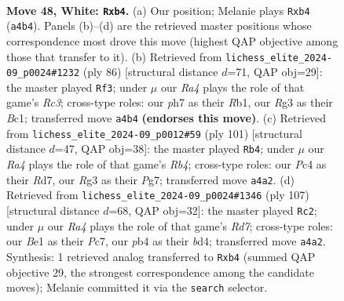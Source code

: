 \documentclass[11pt]{article}
\begin{document}
\clearpage

\begin{figure}[p]\centering
\begin{subfigure}{0.46\textwidth}\centering
\resizebox{\linewidth}{!}{%
\newchessgame
\chessboard[
  setfen={1r1r1b2/7p/p2pn1k1/P3p1Pp/RpP1P3/1P3PR1/2K3B1/4B3 w - - 10 48},
  showmover=false,
  pgfstyle=straightmove, color=movearrow, markmove={a4-b4}
]}
\caption{}
\end{subfigure}\hfill
\begin{subfigure}{0.46\textwidth}\centering
\resizebox{\linewidth}{!}{%
\newchessgame
\chessboard[
  setfen={rn4k1/4b1p1/r3p2p/1b1pP2P/1PpP2P1/P1R5/6K1/1RBB2N1 w - - 1 44},
  showmover=false,
  pgfstyle=straightmove, color=movearrow, markmove={c3-f3}
]}
\caption{}
\end{subfigure}
\\[4pt]
\begin{subfigure}{0.46\textwidth}\centering
\resizebox{\linewidth}{!}{%
\newchessgame
\chessboard[
  setfen={8/3r2pk/1bp2p2/pr2pPp1/4P1K1/1PRP3P/2R1N1P1/8 b - - 7 51},
  showmover=false,
  pgfstyle=straightmove, color=movearrow, markmove={b5-b4}
]}
\caption{}
\end{subfigure}\hfill
\begin{subfigure}{0.46\textwidth}\centering
\resizebox{\linewidth}{!}{%
\newchessgame
\chessboard[
  setfen={2k5/2p2p2/2pr2p1/p5Pp/P2BPK1P/1bP2P2/3r4/R6R b - - 58 54},
  showmover=false,
  pgfstyle=straightmove, color=movearrow, markmove={d2-c2}
]}
\caption{}
\end{subfigure}
\caption{\textbf{Move 48, White: \texttt{Rxb4}.} (a) Our position; Melanie plays \texttt{Rxb4} (\texttt{a4b4}). Panels (b)--(d) are the retrieved master positions whose correspondence most drove this move (highest QAP objective among those that transfer to it). (b) Retrieved from \texttt{lichess\_elite\_2024-09\_p0024\#1232} (ply 86) [structural distance $d$=71, QAP obj=29]: the master played \texttt{Rf3}; under $\mu$ our \emph{Ra4} plays the role of that game's \emph{Rc3}; cross-type roles: our \emph{p}h7 as their \emph{R}b1, our \emph{R}g3 as their \emph{B}c1; transferred move \texttt{a4b4} \textbf{(endorses this move)}. (c) Retrieved from \texttt{lichess\_elite\_2024-09\_p0012\#59} (ply 101) [structural distance $d$=47, QAP obj=38]: the master played \texttt{Rb4}; under $\mu$ our \emph{Ra4} plays the role of that game's \emph{Rb4}; cross-type roles: our \emph{P}c4 as their \emph{R}d7, our \emph{R}g3 as their \emph{P}g7; transferred move \texttt{a4a2}. (d) Retrieved from \texttt{lichess\_elite\_2024-09\_p0024\#1346} (ply 107) [structural distance $d$=68, QAP obj=32]: the master played \texttt{Rc2}; under $\mu$ our \emph{Ra4} plays the role of that game's \emph{Rd7}; cross-type roles: our \emph{B}e1 as their \emph{P}c7, our \emph{p}b4 as their \emph{b}d4; transferred move \texttt{a4a2}. Synthesis: 1 retrieved analog transferred to \texttt{Rxb4} (summed QAP objective 29, the strongest correspondence among the candidate moves); Melanie committed it via the \texttt{search} selector.}
\label{fig:thought-m94}
\end{figure}
\end{document}
